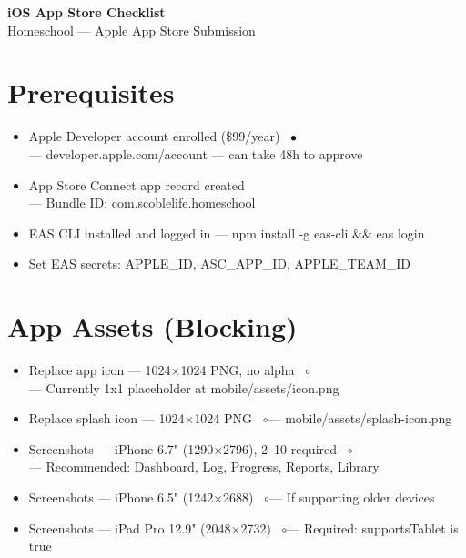 \documentclass[9pt,letterpaper]{article}
\newcommand{\done}{~\hfill$\bullet$}
\newcommand{\needs}{~\hfill$\circ$}
\newcommand{\dt}[1]{{\footnotesize\color{lg}--- #1}}
\begin{document}
\begin{center}
{\Large\bfseries iOS App Store Checklist}\\[2pt]
{\small\color{mg}Homeschool --- Apple App Store Submission}
\end{center}
\vspace{-0.5em}

\section*{Prerequisites}
\begin{itemize}[leftmargin=1.5em, label=$\square$, itemsep=1pt, parsep=0pt, topsep=2pt]
  \item Apple Developer account enrolled (\$99/year) \done\\
    \dt{developer.apple.com/account --- can take 48h to approve}
  \item App Store Connect app record created\\
    \dt{Bundle ID: com.scoblelife.homeschool}
  \item EAS CLI installed and logged in \dt{npm install -g eas-cli \&\& eas login}
  \item Set EAS secrets: APPLE\_ID, ASC\_APP\_ID, APPLE\_TEAM\_ID
\end{itemize}

\section*{App Assets (Blocking)}
\begin{itemize}[leftmargin=1.5em, label=$\square$, itemsep=1pt, parsep=0pt, topsep=2pt]
  \item Replace app icon --- 1024$\times$1024 PNG, no alpha \needs\\
    \dt{Currently 1x1 placeholder at mobile/assets/icon.png}
  \item Replace splash icon --- 1024$\times$1024 PNG \needs \dt{mobile/assets/splash-icon.png}
  \item Screenshots --- iPhone 6.7" (1290$\times$2796), 2--10 required \needs\\
    \dt{Recommended: Dashboard, Log, Progress, Reports, Library}
  \item Screenshots --- iPhone 6.5" (1242$\times$2688) \needs \dt{If supporting older devices}
  \item Screenshots --- iPad Pro 12.9" (2048$\times$2732) \needs \dt{Required: supportsTablet is true}
\end{itemize}
\end{document}
